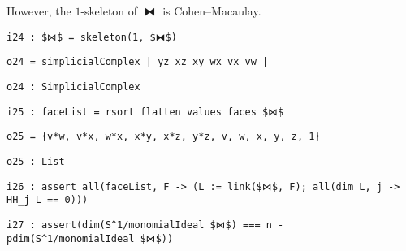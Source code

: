 \documentclass[12pt,leqno]{amsart}
\theoremstyle{definition}
\begin{document}
However, the $1$-skeleton of $⧓$ is Cohen--Macaulay.
\begin{lstlisting}[xleftmargin=10pt, aboveskip=3.0pt, belowskip=1.5pt]
i24 : $⋈$ = skeleton(1, $⧓$)
\end{lstlisting}
\begin{lstlisting}[xleftmargin=10pt, aboveskip=1.5pt, belowskip=1.5pt]
o24 = simplicialComplex | yz xz xy wx vx vw |
\end{lstlisting}
\begin{lstlisting}[xleftmargin=10pt, aboveskip=1.5pt, belowskip=1.5pt]
o24 : SimplicialComplex
\end{lstlisting}
\begin{lstlisting}[xleftmargin=10pt, aboveskip=1.5pt, belowskip=1.5pt]
i25 : faceList = rsort flatten values faces $⋈$
\end{lstlisting}
\begin{lstlisting}[xleftmargin=10pt, lineskip=-10pt, aboveskip=4pt, belowskip=1pt]
o25 = {v*w, v*x, w*x, x*y, x*z, y*z, v, w, x, y, z, 1}
\end{lstlisting}
\begin{lstlisting}[xleftmargin=10pt, aboveskip=1.5pt, belowskip=1.5pt]
o25 : List
\end{lstlisting}
\begin{lstlisting}[xleftmargin=10pt, aboveskip=1.5pt, belowskip=1.5pt]
i26 : assert all(faceList, F -> (L := link($⋈$, F); all(dim L, j -> HH_j L == 0)))
\end{lstlisting}
\begin{lstlisting}[xleftmargin=10pt, aboveskip=1.5pt, belowskip=3.0pt]
i27 : assert(dim(S^1/monomialIdeal $⋈$) === n - pdim(S^1/monomialIdeal $⋈$))
\end{lstlisting}
\end{document}

